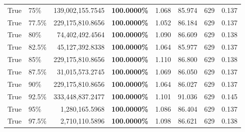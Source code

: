 \begin{table}[H]
\begin{tabular}{|m{}| m{}| r | R{0.13\textwidth}| R{0.09\textwidth}| R{0.09\textwidth}| R{0.1\textwidth}| R{0.11\textwidth}|}
 
True & 75\% & 139,002,155.7545 & \bfseries \color{red} 100.0000\% & 1.068 & 85.974 & 629 & 0.137 \\
 
True & 77.5\% & 229,175,810.8656 & \bfseries \color{red} 100.0000\% & 1.052 & 86.184 & 629 & 0.137 \\
 
True & 80\% & 74,402,492.4564 & \bfseries \color{red} 100.0000\% & 1.090 & 86.609 & 629 & 0.138 \\
 
True & 82.5\% & 45,127,392.8338 & \bfseries \color{red} 100.0000\% & 1.064 & 85.977 & 629 & 0.137 \\
 
True & 85\% & 229,175,810.8656 & \bfseries \color{red} 100.0000\% & 1.110 & 86.800 & 629 & 0.138 \\
 
True & 87.5\% & 31,015,573.2745 & \bfseries \color{red} 100.0000\% & 1.069 & 86.050 & 629 & 0.137 \\
 
True & 90\% & 229,175,810.8656 & \bfseries \color{red} 100.0000\% & 1.064 & 86.027 & 629 & 0.137 \\
 
True & 92.5\% & 333,448,837.2477 & \bfseries \color{red} 100.0000\% & 1.101 & 91.036 & 629 & 0.145 \\
 
True & 95\% & 1,280,165.5968 & \bfseries \color{red} 100.0000\% & 1.086 & 86.404 & 629 & 0.137 \\
 
True & 97.5\% & 2,710,110.5896 & \bfseries \color{red} 100.0000\% & 1.098 & 86.621 & 629 & 0.138 \\
 
\bottomrule
\end{tabular}
\end{table}

